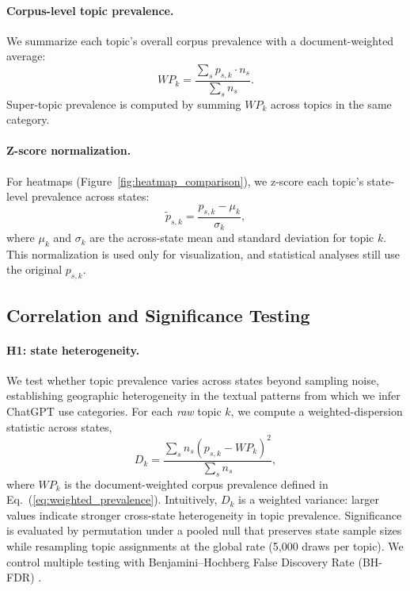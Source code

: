 \documentclass[11pt]{article}
\begin{document}
\paragraph{Corpus-level topic prevalence.}
We summarize each topic's overall corpus prevalence with a document-weighted average:
\begin{equation}
  WP_k =
  \frac{\sum_s p_{s,k}\cdot n_s}{\sum_s n_s}.
  \label{eq:weighted_prevalence}
\end{equation}
Super-topic prevalence is computed by summing $WP_k$ across topics in the same category.

\paragraph{Z-score normalization.}
For heatmaps (Figure~\ref{fig:heatmap_comparison}), we z-score each topic's state-level prevalence across states:
\begin{equation}
  \tilde{p}_{s,k}
  =
  \frac{p_{s,k}-\mu_k}{\sigma_k},
  \label{eq:zscore_topic_prop}
\end{equation}
where $\mu_k$ and $\sigma_k$ are the across-state mean and standard deviation for topic $k$. This normalization is used only for visualization, and statistical analyses still use the original $p_{s,k}$.


\subsection{Correlation and Significance Testing}

\paragraph{H1: state heterogeneity.}
We test whether topic prevalence varies across states beyond sampling noise, establishing geographic heterogeneity in the textual patterns from which we infer ChatGPT use categories. For each \emph{raw} topic $k$, we compute a weighted-dispersion statistic across states,
\begin{equation}
D_k=\frac{\sum_s n_s\left(p_{s,k}-WP_k\right)^2}{\sum_s n_s},
\label{eq:weighted_dispersion}
\end{equation}
where $WP_k$ is the document-weighted corpus prevalence defined in Eq.~(\ref{eq:weighted_prevalence}). Intuitively, $D_k$ is a weighted variance: larger values indicate stronger cross-state heterogeneity in topic prevalence. Significance is evaluated by permutation under a pooled null that preserves state sample sizes while resampling topic assignments at the global rate (5,000 draws per topic). We control multiple testing with Benjamini--Hochberg False Discovery Rate (BH-FDR) \citep{benjamini1995controlling}.
\end{document}

